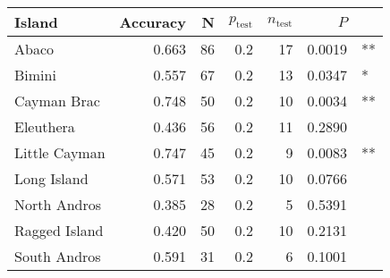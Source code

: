 
\begin{tabular}{lrrrrrl}
\toprule
Island & Accuracy & N & $p_{\mbox{test}}$ & $n_{\mbox{test}}$ & $P$ & \\
\midrule
Abaco & 0.663 & 86 & 0.2 & 17 & 0.0019 & **\\
Bimini & 0.557 & 67 & 0.2 & 13 & 0.0347 & *\\
Cayman Brac & 0.748 & 50 & 0.2 & 10 & 0.0034 & **\\
Eleuthera & 0.436 & 56 & 0.2 & 11 & 0.2890 & \\
Little Cayman & 0.747 & 45 & 0.2 & 9 & 0.0083 & **\\
Long Island & 0.571 & 53 & 0.2 & 10 & 0.0766 & \\
North Andros & 0.385 & 28 & 0.2 & 5 & 0.5391 & \\
Ragged Island & 0.420 & 50 & 0.2 & 10 & 0.2131 & \\
South Andros & 0.591 & 31 & 0.2 & 6 & 0.1001 & \\
\bottomrule
\end{tabular}
